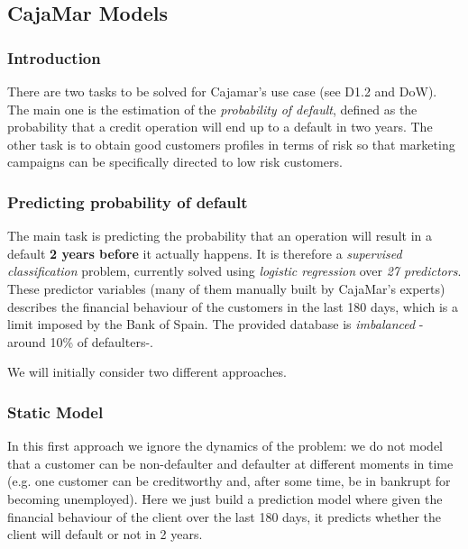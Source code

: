 \subsection{CajaMar Models}
\label{Section:CajaMarModels}

\subsubsection{Introduction}

There are two tasks to be solved for Cajamar's use case (see D1.2 and DoW). The main one is
the estimation of the \emph{probability of default}, defined as the probability that a
credit operation will end up to a default in two years. The other task is to obtain 
good customers profiles in terms of risk so that marketing campaigns can be
specifically directed to low risk customers. 

\subsubsection{Predicting probability of default}


The main task is predicting the probability that an operation will result in a default
\textbf{2 years before} it actually happens. It is therefore a \emph{supervised classification} problem,
currently solved using \emph{logistic regression} over \emph{27 predictors}. These predictor variables (many  of them manually built by CajaMar's experts) 
describes the financial behaviour of the customers in the last 180 days, which is a limit imposed by the Bank of Spain.  
The provided database is \emph{imbalanced} -around 10\% of defaulters-. 

We will initially consider two different approaches.

\subsubsection*{Static Model} 

In this first approach we ignore the dynamics of the problem: we do not model that a customer can be non-defaulter and defaulter at different moments in time (e.g. one customer can be creditworthy and, after some time, be in bankrupt for becoming unemployed). Here we just build a prediction model where given the financial behaviour of the client over the last 180 days, it predicts whether the client will default or not in 2 years. 

